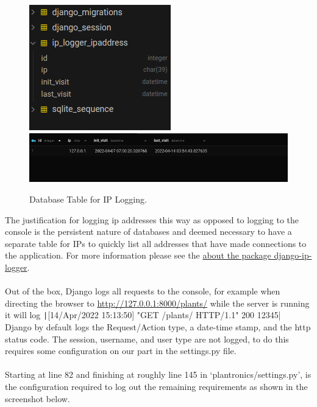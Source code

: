 \documentclass{article}
\begin{document}
        \begin{figure}[!htb]
            \centering
            \caption{Database Table for IP Logging.}
            \includegraphics[scale=0.50]{log1}
            \includegraphics[scale=0.70]{log2}
        \end{figure}  
    
    The justification for logging ip addresses this way as opposed to logging to the console is the persistent nature of databases and deemed necessary to have a separate table for IPs to quickly list all addresses that have made connections to the application. For more information please see the \href{https://pypi.org/project/django-ip-logger/}{about the package django-ip-logger}.
    \\
    \\
    Out of the box, Django logs all requests to the console, for example when directing the browser to \href{http://127.0.0.1:8000/plants/}{http://127.0.0.1:8000/plants/} while the server is running it will log \texttt|[14/Apr/2022 15:13:50] "GET /plants/ HTTP/1.1" 200 12345|
    \\
    Django by default logs the Request/Action type, a date-time stamp, and the http status code. The session, username, and user type are not logged, to do this requires some configuration on our part in the settings.py file.
    \\
    \\
    Starting at line 82 and finishing at roughly line 145 in `plantronics/settings.py', is the configuration required to log out the remaining requirements as shown in the screenshot below.
    
\end{document}
